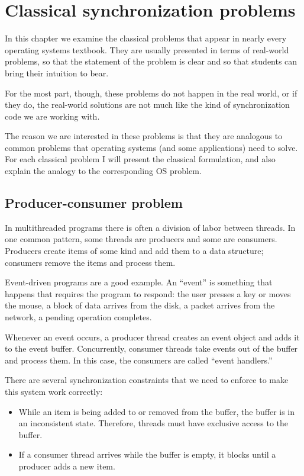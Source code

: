 \documentclass{book}
\newcommand{\clearemptydoublepage}{\newpage\cleardoublepage}
\begin{document}
\clearemptydoublepage
\chapter{Classical synchronization problems}

In this chapter we examine the classical problems that appear
in nearly every operating systems textbook.  They
are usually presented in terms of real-world problems, so
that the statement of the problem is clear and so that students
can bring their intuition to bear.

For the most part, though, these problems do not happen in the
real world, or if they do, the real-world solutions are not much
like the kind of synchronization code we are working with.

The reason we are interested in these problems
is that they are analogous to common problems that operating
systems (and some applications) need to solve.  For each classical
problem I will present the classical formulation, and also explain
the analogy to the corresponding OS problem.


\section{Producer-consumer problem}

In multithreaded programs there is often a division of labor between
threads.  In one common pattern, some threads are producers and some
are consumers.  Producers create items of some kind and add them to a
data structure; consumers remove the items and process them.

Event-driven programs are a good example.  An ``event'' is something
that happens that requires the program to respond: the user presses a
key or moves the mouse, a block of data arrives from the disk, a
packet arrives from the network, a pending operation completes.

Whenever an event occurs, a producer thread creates an event
object and adds it to the event buffer.  Concurrently, consumer
threads take events out of the buffer and process them.
In this case, the consumers are called ``event handlers.''

There are several synchronization constraints that we need to
enforce to make this system work correctly:

\begin{itemize}

\item While an item is being added to or removed from the buffer,
the buffer is in an inconsistent state.  Therefore, threads must
have exclusive access to the buffer.

\item If a consumer thread arrives while the buffer is empty, it
blocks until a producer adds a new item.

\end{itemize}
\end{document}
